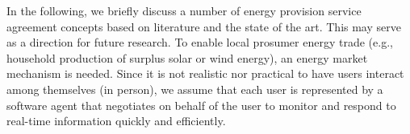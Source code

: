 In the following, we briefly discuss a number of energy provision service agreement concepts based on literature and the state of the art. This may serve as a direction for future research. 
To enable local prosumer energy trade (e.g., household production of surplus solar or wind energy), an energy market mechanism is needed. Since it is not realistic nor practical to have users interact among
themselves (in person), we assume that each user is 
represented by a software agent that negotiates on behalf of the user \citep[e.g.][]{wooldridge1995intelligent}
to monitor and respond to real-time information quickly
and efficiently. %

